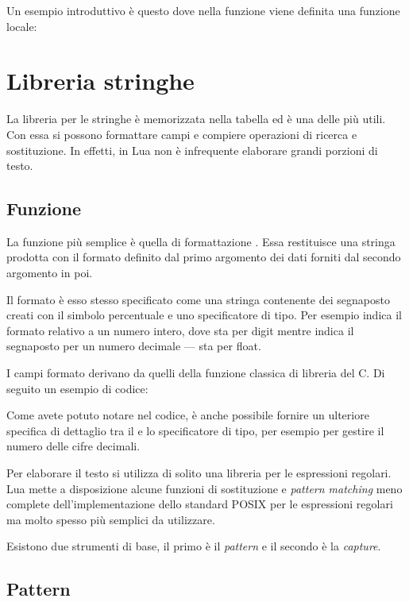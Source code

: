 Un esempio introduttivo è questo dove nella funzione  viene definita una
funzione locale:


\section{Libreria stringhe}

La libreria per le stringhe è memorizzata nella tabella  ed è una
delle più utili. Con essa si possono formattare campi e compiere operazioni di
ricerca e sostituzione. In effetti, in Lua non è infrequente elaborare grandi
porzioni di testo.


\subsection{Funzione }

La funzione più semplice è quella di formattazione . Essa
restituisce una stringa prodotta con il formato definito dal primo argomento
dei dati forniti dal secondo argomento in poi.

Il formato è esso stesso specificato come una stringa contenente dei segnaposto
creati con il simbolo percentuale e uno specificatore di tipo. Per esempio
 indica il formato relativo a un numero intero, dove  sta per
digit mentre  indica il segnaposto per un numero decimale --- 
sta per float.

I campi formato derivano da quelli della funzione classica di libreria
 del C. Di seguito un esempio di codice:

Come avete potuto notare nel codice, è anche possibile fornire un ulteriore
specifica di dettaglio tra il \key{\%} e lo specificatore di tipo, per esempio
per gestire il numero delle cifre decimali.

Per elaborare il testo si utilizza di solito una libreria per le espressioni
regolari. Lua mette a disposizione alcune funzioni di sostituzione e
\emph{pattern matching} meno complete dell'implementazione dello standard
POSIX per le espressioni regolari ma molto spesso più semplici da utilizzare.

Esistono due strumenti di base, il primo è il \emph{pattern} e il secondo è la
\emph{capture}.


\subsection{Pattern}

